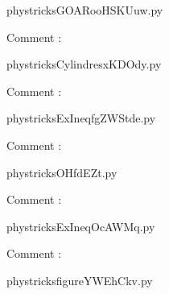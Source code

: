     \newcommand{\CaptionFigGOARooHSKUuw}{<+Type your caption here+>}
    \begin{center}
        
    \end{center}
    phystricksGOARooHSKUuw.py

    Comment : 

    \clearpage
    


    \newcommand{\CaptionFigCylindresxKDOdy}{<+Type your caption here+>}
    \begin{center}
        
    \end{center}
    phystricksCylindresxKDOdy.py

    Comment : 

    \clearpage
    


    \newcommand{\CaptionFigExIneqfgZWStde}{<+Type your caption here+>}
    \begin{center}
        
    \end{center}
    phystricksExIneqfgZWStde.py

    Comment : 

    \clearpage
    


    \newcommand{\CaptionFigOHfdEZt}{<+Type your caption here+>}
    \begin{center}
        
    \end{center}
    phystricksOHfdEZt.py

    Comment : 

    \clearpage
    


    \newcommand{\CaptionFigExIneqOcAWMq}{<+Type your caption here+>}
    \begin{center}
        
    \end{center}
    phystricksExIneqOcAWMq.py

    Comment : 

    \clearpage
    


    \newcommand{\CaptionFigfigureYWEhCkv}{<+Type your caption here+>}
    \begin{center}
        
    \end{center}
    phystricksfigureYWEhCkv.py

